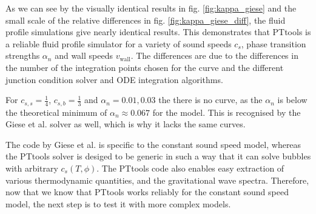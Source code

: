 As we can see by the visually identical results in fig. \ref{fig:kappa_giese}
and the small scale of the relative differences in fig. \ref{fig:kappa_giese_diff},
the fluid profile simulations give nearly identical results.
This demonstrates that PTtools is a reliable fluid profile simulator for a variety of
sound speeds $c_s$, phase transition strengths $\alpha_n$ and wall speeds $v_\text{wall}$.
The differences are due to the differences in the number of the integration points chosen for the curve
and the different junction condition solver and ODE integration algorithms.

For $c_{s,s}=\frac{1}{4}$, $c_{s,b}=\frac{1}{3}$ and $\alpha_n = 0.01, 0.03$ the there is no curve,
as the $\alpha_n$ is below the theoretical minimum of $\alpha_n \approx 0.067$ for the model.
This is recognised by the Giese et al. solver as well,
which is why it lacks the same curves.

The code by Giese et al. is specific to the constant sound speed model,
whereas the PTtools solver is desiged to be generic in such a way that
it can solve bubbles with arbitrary $c_s(T,\phi)$.
The PTtools code also enables easy extraction of various thermodynamic quantities,
and the gravitational wave spectra.
Therefore, now that we know that PTtools works reliably for the constant sound speed model,
the next step is to test it with more complex models.
